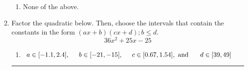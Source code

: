 \documentclass[14pt]{extbook}
\newcommand{\litem}[1]{\item#1\hspace*{-1cm}\rule{\textwidth}{0.4pt}}
\begin{document}
\begin{enumerate}
{\begin{enumerate}[label=\Alph*.]
\item None of the above.
\end{enumerate} }
\litem{
Factor the quadratic below. Then, choose the intervals that contain the constants in the form $(ax+b)(cx+d); b \leq d.$\[ 36x^{2} +25 x -25 \]\begin{enumerate}[label=\Alph*.]
\item \( a \in [-1.1, 2.4], \hspace*{5mm} b \in [-21, -15], \hspace*{5mm} c \in [0.67, 1.54], \text{ and } \hspace*{5mm} d \in [39, 49] \)

\end{enumerate}}
\end{enumerate}
\end{document}
